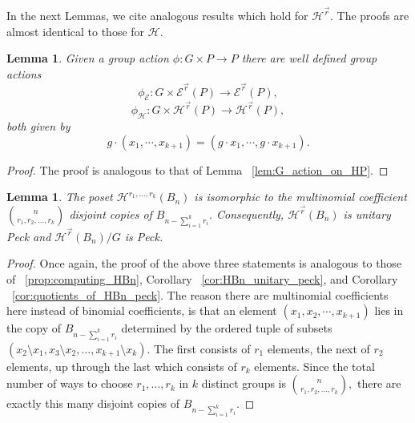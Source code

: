 \documentclass[10 pt]{amsart}
\theoremstyle{plain}
\newtheorem{lem}[thm]{Lemma}
\theoremstyle{definition}
\theoremstyle{remark}
\numberwithin{equation}{section}
\renewcommand{\vec}[1]{\overrightarrow{#1}}
\begin{document}
In the next Lemmas, we cite analogous results which hold for $\mathcal H^{\vec r}.$ The proofs are almost identical to those for $\mathcal H.$

\begin{lem}
Given a group action $\phi:G \times P \rightarrow P$ there are well defined group actions 
$$\phi_{\mathcal E}:G\times \mathcal E^{\vec r}(P) \rightarrow \mathcal E^{\vec r}(P),$$
$$\phi_{\mathcal H}:G\times \mathcal H^{\vec r}(P) \rightarrow \mathcal H^{\vec r}(P),$$ 
both given by 
$$g \cdot (x_1, \cdots, x_{k+1}) =(g\cdot x_1, \cdots, g \cdot x_{k+1}).$$
\end{lem}
\begin{proof}
The proof is analogous to that of Lemma ~\ref{lem:G_action_on_HP}.
\end{proof}

\begin{lem}
\label{lem:peck_quotients_vector_f}
The poset $\mathcal H^{r_1,\ldots, r_k}(B_n)$ is isomorphic to the multinomial coefficient \linebreak $\binom n {r_1,r_2,\ldots, r_k}$ disjoint copies of $B_{n- \sum_{i=1}^k r_i}.$ Consequently, $\mathcal H^{\vec r}(B_n)$ is unitary Peck and \linebreak
$\mathcal H^{\vec r}(B_n)/G$ is Peck.
\end{lem}
\begin{proof}
Once again, the proof of the above three statements is analogous to those of ~\ref{prop:computing_HBn}, Corollary ~\ref{cor:HBn_unitary_peck}, and Corollary ~\ref{cor:quotients_of_HBn_peck}. The reason there are multinomial coefficients here instead of binomial coefficients, is that an element $(x_1, x_2, \cdots, x_{k+1})$ lies in the copy of $B_{n -\sum_{i=1}^k r_i}$ determined by the ordered tuple of subsets $(x_2 \setminus x_1,x_3 \setminus x_2, \ldots, x_{k+1} \setminus x_k).$ The first consists of $r_1$ elements, the next of $r_2$ elements, up through the last which consists of $r_k$ elements. Since the total number of ways to choose $r_1,\ldots, r_k$ in $k$ distinct groups is $\binom n {r_1,r_2,\ldots, r_k},$ there are exactly this many disjoint copies of $B_{n- \sum_{i=1}^k r_i}.$
\end{proof}





\end{document}
